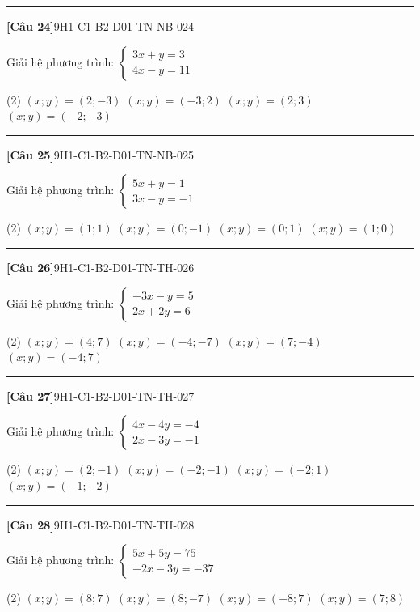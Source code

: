 \documentclass[12pt,a4paper]{article}
\newif\ifloigiai
\newenvironment{cauhoi}[2]{%
  \par\medskip\noindent\rule{\textwidth}{0.4pt}\par\nopagebreak
  \noindent\textbf{[#1]}\hfill{\scriptsize\ttfamily #2}\par\nopagebreak\smallskip}{\par}
\newcommand{\dapan}[1]{\ifloigiai\par\smallskip\noindent\textit{Đáp án:} \textbf{#1}\par\fi}
\begin{document}
\begin{cauhoi}{Câu 24}{9H1-C1-B2-D01-TN-NB-024}
Giải hệ phương trình: $\begin{cases}3x + y=3\\ 4x - y=11\end{cases}$
\begin{tasks}(2)
\task $(x;y)=(2;-3)$
\task $(x;y)=(-3;2)$
\task $(x;y)=(2;3)$
\task $(x;y)=(-2;-3)$
\end{tasks}
\dapan{A}
\end{cauhoi}
\begin{cauhoi}{Câu 25}{9H1-C1-B2-D01-TN-NB-025}
Giải hệ phương trình: $\begin{cases}5x + y=1\\ 3x - y=-1\end{cases}$
\begin{tasks}(2)
\task $(x;y)=(1;1)$
\task $(x;y)=(0;-1)$
\task $(x;y)=(0;1)$
\task $(x;y)=(1;0)$
\end{tasks}
\dapan{C}
\end{cauhoi}
\begin{cauhoi}{Câu 26}{9H1-C1-B2-D01-TN-TH-026}
Giải hệ phương trình: $\begin{cases}-3x - y=5\\ 2x + 2y=6\end{cases}$
\begin{tasks}(2)
\task $(x;y)=(4;7)$
\task $(x;y)=(-4;-7)$
\task $(x;y)=(7;-4)$
\task $(x;y)=(-4;7)$
\end{tasks}
\dapan{D}
\end{cauhoi}
\begin{cauhoi}{Câu 27}{9H1-C1-B2-D01-TN-TH-027}
Giải hệ phương trình: $\begin{cases}4x - 4y=-4\\ 2x - 3y=-1\end{cases}$
\begin{tasks}(2)
\task $(x;y)=(2;-1)$
\task $(x;y)=(-2;-1)$
\task $(x;y)=(-2;1)$
\task $(x;y)=(-1;-2)$
\end{tasks}
\dapan{B}
\end{cauhoi}
\begin{cauhoi}{Câu 28}{9H1-C1-B2-D01-TN-TH-028}
Giải hệ phương trình: $\begin{cases}5x + 5y=75\\ -2x - 3y=-37\end{cases}$
\begin{tasks}(2)
\task $(x;y)=(8;7)$
\task $(x;y)=(8;-7)$
\task $(x;y)=(-8;7)$
\task $(x;y)=(7;8)$
\end{tasks}
\dapan{A}
\end{cauhoi}
\end{document}
